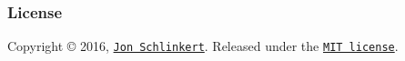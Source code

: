 {\ttfamily \subsubsection*{License}}

{\ttfamily }

{\ttfamily Copyright © 2016, \href{https://github.com/jonschlinkert}{\tt Jon Schlinkert}. Released under the \href{https://github.com/jonschlinkert/object.omit/blob/master/LICENSE}{\tt M\+IT license}.}

{\ttfamily 

}

{ }